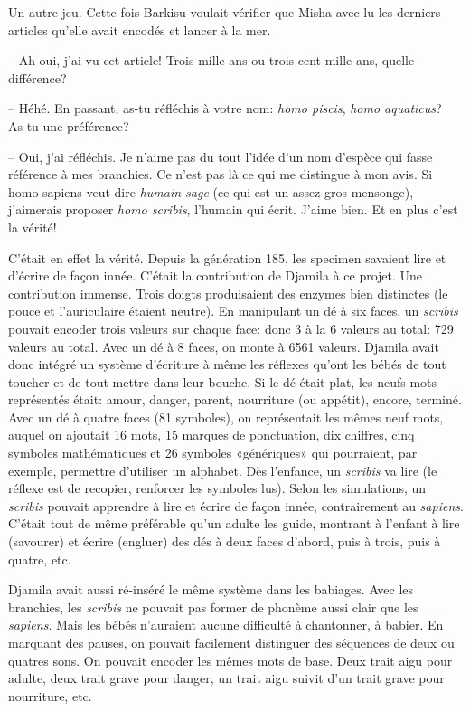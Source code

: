 Un autre jeu. 
%
Cette fois Barkisu voulait vérifier que Misha avec lu les derniers articles qu'elle avait
encodés et lancer à la mer.
%

-- Ah oui, j'ai vu cet article! Trois mille ans ou trois cent mille ans, quelle différence?

-- Héhé. En passant, as-tu réfléchis à votre nom: \textit{homo piscis}, \textit{homo aquaticus}? As-tu une préférence?

-- Oui, j'ai réfléchis. Je n'aime pas du tout l'idée d'un nom d'espèce qui fasse référence à mes branchies. Ce n'est pas là ce qui me distingue à mon avis. 
   Si homo sapiens veut dire \textit{humain sage} (ce qui est un assez gros mensonge), j'aimerais
   proposer \textit{homo scribis}, l'humain qui écrit. J'aime bien. Et en plus c'est la vérité!

C'était en effet la vérité. Depuis la génération 185, les specimen savaient
lire et d'écrire de façon innée. C'était la contribution de Djamila à ce
projet. Une contribution immense.  Trois doigts produisaient des enzymes bien
distinctes (le pouce et l'auriculaire étaient neutre).  En manipulant un dé à
six faces, un \textit{scribis} pouvait encoder trois valeurs sur chaque face:
donc 3 à la 6 valeurs au total: 729 valeurs au total.  Avec un dé à 8 faces, on
monte à 6561 valeurs.  Djamila avait donc intégré un système d'écriture à même
les réflexes qu'ont les bébés de tout toucher et de tout mettre dans leur
bouche.  Si le dé était plat, les neufs mots représentés était: amour, danger,
parent, nourriture (ou appétit), encore, terminé.  Avec un dé à quatre faces
(81 symboles), on représentait les mêmes neuf mots, auquel on ajoutait 16 mots,
15 marques de ponctuation, dix chiffres, cinq symboles mathématiques et 26 symboles
«génériques» qui pourraient, par exemple, permettre d'utiliser un alphabet.
Dès l'enfance, un \textit{scribis} va lire (le réflexe est de recopier,
renforcer les symboles lus).  Selon les simulations, un \textit{scribis}
pouvait apprendre à lire et écrire de façon innée, contrairement au
\textit{sapiens}.  C'était tout de même préférable qu'un adulte les guide,
montrant à l'enfant à lire (savourer) et écrire (engluer) des dés à deux faces
d'abord, puis à trois, puis à quatre, etc.

Djamila avait aussi ré-inséré le même système dans les babiages.  Avec les
branchies, les \textit{scribis} ne pouvait pas former de phonème aussi clair
que les \textit{sapiens}.  Mais les bébés n'auraient aucune difficulté à
chantonner, à babier.  En marquant des pauses, on pouvait facilement distinguer
des séquences de deux ou quatres sons. On pouvait encoder les mêmes mots de
base. Deux trait aigu pour adulte, deux trait grave pour danger, un trait aigu
suivit d'un trait grave pour nourriture, etc.


